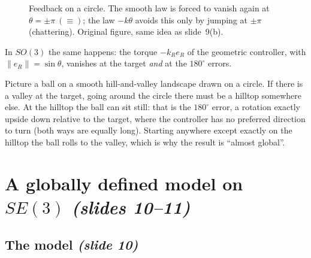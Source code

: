 \documentclass[11pt,a4paper]{article}
\newcommand{\eR}{e_R}
\newcommand{\sli}[1]{\emph{(#1)}}
\theoremstyle{definition}
\theoremstyle{plain}
\theoremstyle{remark}
\begin{document}
\begin{figure}[h]
\centering
{}
\caption{Feedback on a circle. The smooth law is forced to vanish again at $\theta=\pm\pi\ (\equiv)$; the law $-k\theta$ avoids this only by jumping at $\pm\pi$ (chattering). Original figure, same idea as slide~9(b).}
\end{figure}

In $SO(3)$ the same happens: the torque $-k_R\eR$ of the geometric controller, with $\|\eR\|=\sin\theta$, vanishes at the target \emph{and} at the $180^\circ$ errors.

\begin{intuition}
Picture a ball on a smooth hill-and-valley landscape drawn on a circle. If there is a valley at the target, going around the circle there must be a hilltop somewhere else. At the hilltop the ball can sit still: that is the $180^\circ$ error, a rotation exactly upside down relative to the target, where the controller has no preferred direction to turn (both ways are equally long). Starting anywhere except exactly on the hilltop the ball rolls to the valley, which is why the result is ``almost global''.
\end{intuition}

\section{A globally defined model on $SE(3)$ \sli{slides 10--11}}
\label{sec:model}

\subsection{The model \sli{slide 10}}
\end{document}
